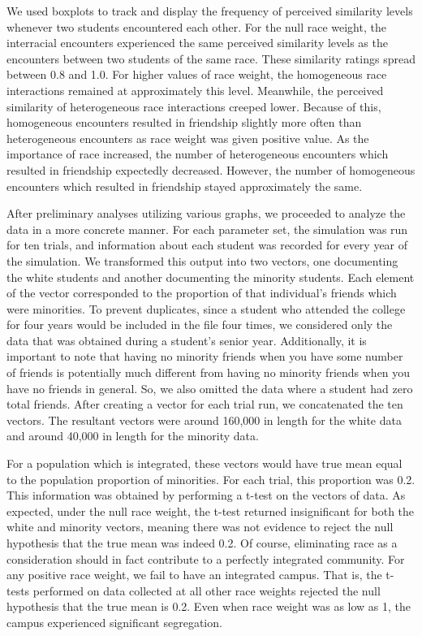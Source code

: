 We used boxplots to track and display the frequency of perceived similarity levels whenever two students encountered each 
other. For the null race weight, the interracial encounters experienced the same perceived similarity levels as the 
encounters between two students of the same race. These similarity ratings spread between 0.8 and 1.0. For higher values of 
race weight, the homogeneous race interactions remained at approximately this level. Meanwhile, the perceived similarity of 
heterogeneous race interactions creeped lower. Because of this, homogeneous encounters resulted in friendship slightly more 
often than heterogeneous encounters as race weight was given positive value. As the importance of race increased, the number 
of heterogeneous encounters which resulted in friendship expectedly decreased. However, the number of homogeneous encounters 
which resulted in friendship stayed approximately the same.

After preliminary analyses utilizing various graphs, we proceeded to analyze the data in a more concrete manner. For each 
parameter set, the simulation was run for ten trials, and information about each student was recorded for every year of the 
simulation. We transformed this output into two vectors, one documenting the white students and another documenting the 
minority students. Each element of the vector corresponded to the proportion of that individual's friends which were 
minorities. To prevent duplicates, since a student who attended the college for four years would be included in the file four 
times, we considered only the data that was obtained during a student's senior year. Additionally, it is important to note 
that having no minority friends when you have some number of friends is potentially much different from having no 
minority friends when you have no friends in general. So, we also omitted the data where a student had zero total friends. 
After creating a vector for each trial run, we concatenated the ten vectors. The resultant vectors were around 160,000 in 
length for the white data and around 40,000 in length for the minority data.

For a population which is integrated, these vectors would have true mean equal to the population proportion of minorities.
For each trial, this proportion was 0.2. This information was obtained by performing a t-test on the vectors of data. As 
expected, under the null race weight, the t-test returned insignificant for both the white and minority vectors, meaning 
there was not evidence to reject the null hypothesis that the true mean was indeed 0.2. Of course, eliminating race as a 
consideration should in fact contribute to a perfectly integrated community. For any positive race weight, we fail to have 
an integrated campus. That is, the t-tests performed on data collected at all other race weights rejected the null hypothesis 
that the true mean is 0.2. Even when race weight was as low as 1, the campus experienced significant segregation.

